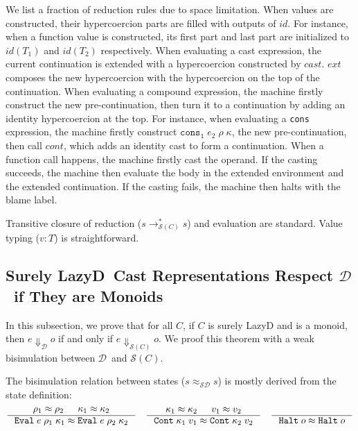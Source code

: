 \documentclass[acmsmall,review,anonymous]{acmart}\settopmatter{printfolios=true,printccs=false,printacmref=false}
\newcommand{\judgeType}[2]{#1 : #2}
\newcommand{\lazyD}{Lazy\;D}
\newcommand{\sOOinspect}[3]{\mathtt{Eval} \; #1 \; #2 \; #3}
\newcommand{\sOOreturn}[2]{\mathtt{Cont} \; #2 \; #1}
\newcommand{\sOOhalt}[1]{\mathtt{Halt} \; #1}
\newcommand{\hckOOconsI}[3]{\mathtt{cons_1}\;#1\;#2\;#3}
\newcommand{\judgeSreduceTrans}[3]{#2 \longrightarrow_{\mathcal{S}(#1)}^{*} #3}
\newcommand{\judgeSeval}[3]{#2 \Downarrow_{\mathcal{S}(#1)} #3}
\newcommand{\eqvSD}[3]{#2 \approx_{\mathcal{SD}} #3}
\newcommand{\ineffCEKD}{$ \mathcal{D} $}
\newcommand{\judgeDeval}[2]{#1 \Downarrow_{\mathcal{D}} #2}
\newcommand{\effCEK}[1]{$ \mathcal{S}(#1) $}
\begin{document}
We list a fraction of reduction rules due to space limitation.
When values are constructed, their hypercoercion parts are filled with outputs 
of $ id $. For instance, when a function value is constructed, its first part 
and last part are initialized to $ id(T_1) $ and $ id(T_2) $ respectively.
When evaluating a cast expression, the current continuation is extended with a 
hypercoercion constructed by $ cast $. $ ext $ composes the new hypercoercion 
with the hypercoercion on the top of the continuation.
When evaluating a compound expression, the machine firstly construct the new 
pre-continuation, then turn it to a continuation by adding an identity 
hypercoercion at the top. For instance, when evaluating a \texttt{cons} 
expression, the machine firstly construct $ \hckOOconsI{e_2}{\rho}{\kappa} $, 
the new pre-continuation, then call $ cont $, which adds an identity cast to 
form a continuation. 
When a function call happens, the machine firstly cast the operand. If the 
casting succeeds, the machine then evaluate the body in the extended 
environment and the extended continuation. If the casting fails, the machine 
then halts with the blame label.

Transitive closure of reduction ($ \judgeSreduceTrans{C}{s}{s} $) and 
evaluation are standard. Value typing ($ \judgeType{v}{T} $) is straightforward.

\subsection{Surely \lazyD\ Cast Representations Respect \ineffCEKD\ if They are 
Monoids}
\label{secc:framework:monoid-correct}

In this subsection, we prove that for all $ C $, if $ C $ is surely LazyD and 
is a monoid, then $ \judgeDeval{e}{o} $ if and only if $ \judgeSeval{C}{e}{o} 
$. We proof this theorem with a weak bisimulation between \ineffCEKD\ and 
\effCEK{C}. 

The bisimulation relation between states ($\eqvSD{C}{s}{s}$) is mostly derived 
from the state definition: \begin{gather*}
\inference{
	\rho_1 \approx \rho_2 &
	\kappa_1 \approx \kappa_2
}{
	\sOOinspect{e}{\rho_1}{\kappa_1} \approx \sOOinspect{e}{\rho_2}{\kappa_2}
}
\quad
\inference{
	\kappa_1 \approx \kappa_2 &
	v_1 \approx v_2
}{
	\sOOreturn{v_1}{\kappa_1} \approx \sOOreturn{v_2}{\kappa_2}
}
\quad
\inference{
}{
	\sOOhalt{o} \approx \sOOhalt{o}
}
\end{gather*}
\end{document}
